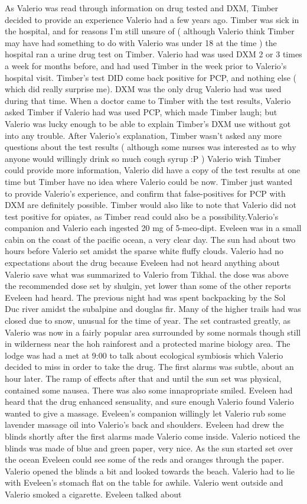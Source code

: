 \documentclass[12pt]{book}
\begin{document}
As Valerio was read through information on drug tested and DXM, Timber decided to provide an experience Valerio had a few years ago. Timber was sick in the hospital, and for reasons I'm still unsure of ( although Valerio think Timber may have had something to do with Valerio was under 18 at the time ) the hospital ran a urine drug test on Timber. Valerio had was used DXM 2 or 3 times a week for months before, and had used Timber in the week prior to Valerio's hospital visit. Timber's test DID come back positive for PCP, and nothing else ( which did really surprise me). DXM was the only drug Valerio had was used during that time. When a doctor came to Timber with the test results, Valerio asked Timber if Valerio had was used PCP, which made Timber laugh; but Valerio was lucky enough to be able to explain Timber's DXM use without got into any trouble. After Valerio's explanation, Timber wasn't asked any more questions about the test results ( although some nurses was interested as to why anyone would willingly drink so much cough syrup :P ) Valerio wish Timber could provide more information, Valerio did have a copy of the test results at one time but Timber have no idea where Valerio could be now. Timber just wanted to provide Valerio's experience, and confirm that false-positives for PCP with DXM are definitely possible. Timber would also like to note that Valerio did not test positive for opiates, as Timber read could also be a possibility.Valerio's companion and Valerio each ingested 20 mg of 5-meo-dipt. Eveleen was in a small cabin on the coast of the pacific ocean, a very clear day. The sun had about two hours before Valerio set amidst the sparse white fluffy clouds. Valerio had no expectations about the drug because Eveleen had not heard anything about Valerio save what was summarized to Valerio from Tikhal. the dose was above the recommended dose set by shulgin, yet lower than some of the other reports Eveleen had heard. The previous night had was spent backpacking by the Sol Duc river amidst the subalpine and douglas fir. Many of the higher trails had was closed due to snow, unusual for the time of year. The set contrasted greatly, as Valerio was now in a fairly popular area surrounded by some normals though still in wilderness near the hoh rainforest and a protected marine biology area. The lodge was had a met at 9:00 to talk about ecological symbiosis which Valerio decided to miss in order to take the drug. The first alarms was subtle, about an hour later. The ramp of effects after that and until the sun set was physical, contained some nausea. There was also some innapropriate smiled. Eveleen had heard that the drug enhanced sensuality, and sure enough Valerio found Valerio wanted to give a massage. Eveleen's companion willingly let Valerio rub some lavender massage oil into Valerio's back and shoulders. Eveleen had drew the blinds shortly after the first alarms made Valerio come inside. Valerio noticed the blinds was made of blue and green paper, very nice. As the sun started set over the ocean Eveleen could see some of the reds and oranges through the paper. Valerio opened the blinds a bit and looked towards the beach. Valerio had to lie with Eveleen's stomach flat on the table for awhile. Valerio went outside and Valerio smoked a cigarette. Eveleen talked about 
\end{document}
